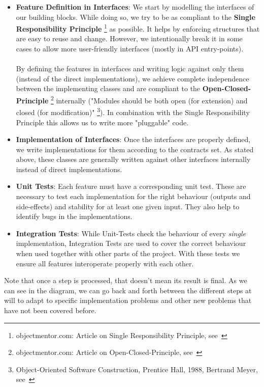 \begin{itemize}
	\item \textbf{Feature Definition in Interfaces}: We start by modelling the interfaces of our building blocks. While doing so, we try to be as compliant to the \textbf{Single Responsibility Principle} \footnote{objectmentor.com: Article on Single Responsibility Principle, see~\cite{singleresponsibility_objectmentor}} as possible. It helps by enforcing structures that are easy to reuse and change. However, we intentionally break it in some cases to allow more user-friendly interfaces (mostly in API entry-points).
	\\\\
	By defining the features in interfaces and writing logic against only them (instead of the direct implementations), we achieve complete independence between the implementing classes and are compliant to the \textbf{Open-Closed-Principle} \footnote{	objectmentor.com: Article on Open-Closed-Principle, see~\cite{openclosed_objectmentor}} internally ("Modules should be both open (for extension) and closed (for modification)" \footnote{Object-Oriented Software Construction, Prentice Hall, 1988, Bertrand Meyer, see~\cite{openclosed_bertrand}}). In combination with the Single Responsibility Principle this allows us to write more "pluggable" code.
	\item \textbf{Implementation of Interfaces}: Once the interfaces are properly defined, we write implementations for them according to the contracts set. As stated above, these classes are generally written against other interfaces internally instead of direct implementations.
	\item \textbf{Unit Tests}: Each feature must have a corresponding unit test. These are necessary to test each implementation for the right behaviour (outputs and side-effects) and stability for at least one given input. They also help to identify bugs in the implementations.
	\item \textbf{Integration Tests}: While Unit-Tests check the behaviour of every \textit{single} implementation, Integration Tests are used to cover the correct behaviour when used together with other parts of the project. With these tests we ensure all features interoperate properly with each other.
\end{itemize}
\noindent
Note that once a step is processed, that doesn't mean its result is final. As we can see in the diagram, we can go back and forth between the different steps at will to adapt to specific implementation problems and other new problems that have not been covered before.
